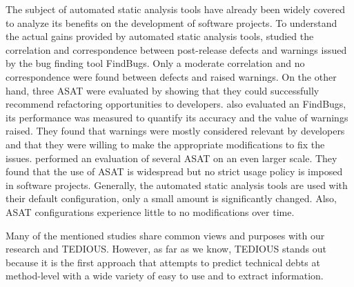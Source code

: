 The subject of automated static analysis tools have already been widely covered to analyze its benefits on the development of software projects. To understand the actual gains provided by automated static analysis tools, \citet{couto2013static} studied the correlation and correspondence between post-release defects and warnings issued by the bug finding tool FindBugs. Only a moderate correlation and no correspondence were found between defects and raised warnings. On the other hand, three \ac{ASAT} were evaluated by \citet{wedyan2009effectiveness} showing that they could successfully recommend refactoring opportunities to developers. \citet{ayewah2007evaluating} also evaluated an FindBugs, its performance was measured to quantify its accuracy and the value of warnings raised. They found that warnings were mostly considered relevant by developers and that they were willing to make the appropriate modifications to fix the issues. \citet{BellerBMZ16} performed an evaluation of several ASAT on an even larger scale. They found that the use of \ac{ASAT} is widespread but no strict usage policy is imposed in software projects. Generally, the automated static analysis tools are used with their default configuration, only a small amount is significantly changed. Also, \ac{ASAT} configurations experience little to no modifications over time. \par 

Many of the mentioned studies share common views and purposes with our research and \ac{TEDIOUS}. However, as far as we know, TEDIOUS stands out because it is the first approach that attempts to predict technical debts at method-level with a wide variety of easy to use and to extract information.













